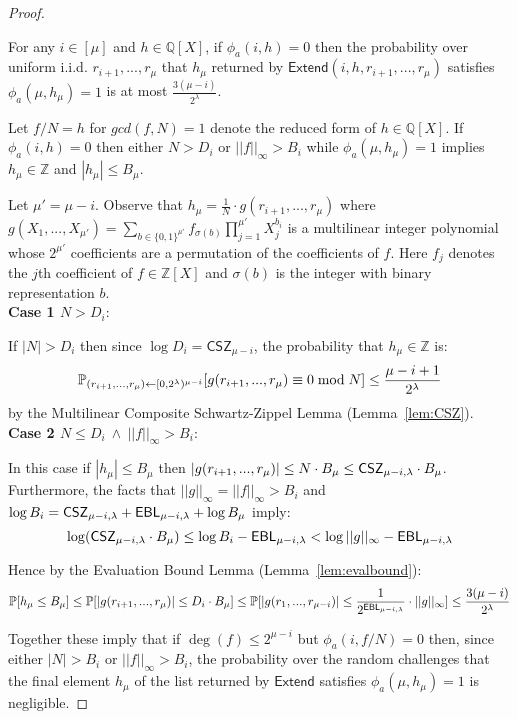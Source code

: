 \begin{proof}
\begin{subclaim} 
For any $i \in [\mu]$ and $h \in \mathbb{Q}[X]$, if $\phi_a(i, h) = 0$ then the probability over uniform i.i.d. $r_{i+1},...,r_\mu$ that $h_\mu$ returned by $\textsf{Extend}(i,h, r_{i+1},...,r_\mu)$ satisfies $\phi_a(\mu, h_\mu) = 1$ is at most $\frac{3(\mu - i)}{2^\lambda}$. 
\end{subclaim} 

Let $f/N = h$ for $gcd(f, N) = 1$ denote the reduced form of $h \in \mathbb{Q}[X]$. If $\phi_a(i,h) = 0$ then either $N > D_i$ or $||f||_\infty > B_i$ while $\phi_a(\mu, h_\mu) = 1$ implies $h_\mu \in \mathbb{Z}$ and $|h_\mu| \leq B_\mu$.

 Let $\mu' = \mu - i$. Observe that $h_\mu = \frac{1}{N} \cdot g(r_{i+1},...,r_\mu)$ where $g(X_1,...,X_{\mu'}) = \sum_{b \in \{0,1\}^{\mu'}} f_{\sigma(b)} \prod_{j=1}^{\mu'}X_j^{b_i}$ is a multilinear integer polynomial whose $2^{\mu'}$ coefficients are a permutation of the coefficients of $f$. Here $f_j$ denotes the $j$th coefficient of $f \in \mathbb{Z}[X]$ and $\sigma(b)$ is the integer with binary representation $b$. \\
 
 \noindent \textbf{Case 1 $N > D_i$}: 
 
 If $|N| > D_i$ then since $\log D_i = \mathsf{CSZ}_{\mu - i}$, the probability that $h_\mu \in \mathbb{Z}$ is:
 $$\Prob_{(r_{i+1},...,r_\mu) \gets [0,2^\lambda)^{\mu -i}} [g(r_{i+1},...,r_\mu)\equiv 0 \bmod N]  \leq \frac{\mu - i +1}{2^\lambda}$$
by the Multilinear Composite Schwartz-Zippel Lemma (Lemma~\ref{lem:CSZ}).\\

 
\noindent \textbf{Case 2 $N \leq D_i \ \wedge \ ||f||_\infty > B_i$}: 
 
In this case if $|h_\mu| \leq B_\mu$ then $|g(r_{i+1},...,r_{\mu})| \leq N \cdot B_\mu \leq \CSZ[\mu - i] \cdot B_\mu$. 
 Furthermore, the facts that $||g||_\infty = ||f||_\infty > B_i$ and $\log B_i = \CSZ[\mu - i] + \EBL[\mu - i] + \log B_\mu$ imply: 
 $$\log (\CSZ[\mu -i] \cdot B_\mu) \leq \log B_i - \EBL[\mu - i ] < \log ||g||_\infty - \EBL[\mu - i]$$
 
Hence by the Evaluation Bound Lemma (Lemma~\ref{lem:evalbound}): 
$$\Prob[h_\mu \leq B_\mu] \leq \Prob[|g(r_{i+1},...,r_{\mu})| \leq D_i \cdot B_\mu] \leq \Prob[|g(r_1,...,r_{\mu-i})| \leq \frac{1}{2^{\EBL[\mu - i]}} \cdot ||g||_\infty] \leq  \frac{3(\mu- i)}{2^{\lambda}}$$

 
Together these imply that if $\deg(f) \leq 2^{\mu -i}$ but $\phi_a(i, f/N) = 0$ then, since either $|N| > B_i$ or $||f||_\infty > B_i$, the probability over the random challenges that the final element $h_\mu$ of the list returned by $\textsf{Extend}$ satisfies $\phi_a(\mu, h_\mu) = 1$ is negligible. 

\end{proof} 


